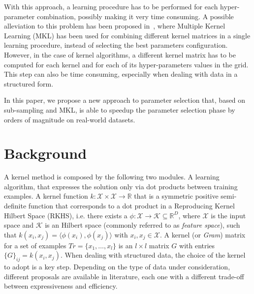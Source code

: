 \documentclass{esannV2}
\newcommand{\1}{{\bf 1}}
\begin{document}
With this approach, a learning procedure has to be performed for each hyper-parameter combination, possibly making it very time consuming.
A possible alleviation to this problem has been proposed in~\cite{Massimo2016}, where Multiple Kernel Learning (MKL) has been used for combining different kernel matrices in a single learning procedure, instead of selecting the best parameters configuration.
However, in the case of kernel algorithms, a different kernel matrix has to be computed for each kernel and for each of its hyper-parameters values in the grid. This step can also be time consuming, especially when dealing with data in a structured form.

In this paper, we propose a new approach to parameter selection that, based on sub-sampling and MKL, is able to speedup the parameter selection phase by orders of magnitude on real-world datasets.

\section{Background}
A kernel method is composed by the following two modules.
A learning algorithm, that expresses the solution only via dot products between training examples.
A kernel function ${k}: \mathcal{X} \times \mathcal{X} \rightarrow \mathbb{R}$ that is a symmetric positive semi-definite function that corresponds to a dot product in a Reproducing Kernel Hilbert Space (RKHS), i.e. there exists a $\phi: \mathcal{X} \rightarrow \mathcal{K} \subseteq \mathbb{R}^D$, where $\mathcal{X}$ is the input space and $\mathcal{K}$ is an Hilbert space (commonly referred to as \textit{feature space}), such that $k(x_i,x_j) = \langle \phi(x_i),\phi(x_j) \rangle$ with $x_i,x_j \in \mathcal{X}$. %
A kernel (or \textit{Gram}) matrix for a set of examples $Tr=\{x_1, \ldots, x_l\}$ is an $l \times l$ matrix $G$ with entries $\{G\}_{ij}=k(x_i,x_j)$.
When dealing with structured data, the choice of the kernel to adopt is a key step. Depending on the type of data under consideration, different proposals are available in literature, each one with a different trade-off between expressiveness and efficiency.
\end{document}
